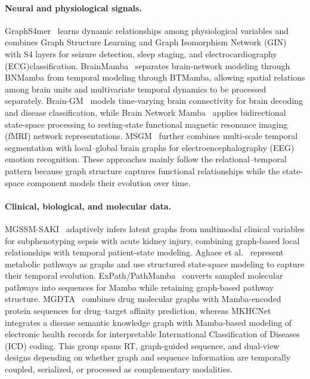 \documentclass[acmsmall]{acmart}
\begin{document}
\paragraph{\textbf{Neural and physiological signals.}}
GraphS4mer~\cite{tang2023modeling} learns dynamic relationships among
physiological variables and combines Graph Structure Learning and Graph Isomorphism Network (GIN) with S4
layers for seizure detection, sleep staging, and electrocardiography (ECG)classification.
BrainMamba~\cite{behrouz2024brain} separates brain-network modeling through
BNMamba from temporal modeling through BTMamba, allowing spatial relations
among brain units and multivariate temporal dynamics to be processed
separately. Brain-GM~\cite{wang2024learning} models time-varying brain
connectivity for brain decoding and disease classification, while Brain
Network Mamba~\cite{zhang2026brainnetworkmamba} applies bidirectional
state-space processing to resting-state functional magnetic resonance imaging (fMRI) network representations.
MSGM~\cite{liu2026msgm} further combines multi-scale temporal segmentation
with local--global brain graphs for electroencephalography (EEG) emotion recognition. These approaches
mainly follow the relational--temporal pattern because graph structure
captures functional relationships while the state-space component models their
evolution over time.

\paragraph{\textbf{Clinical, biological, and molecular data.}}
MGSSM-SAKI~\cite{xu2024identifying} adaptively infers latent graphs from
multimodal clinical variables for subphenotyping sepsis with acute kidney
injury, combining graph-based local relationships with temporal patient-state
modeling. Aghaee et al.~\cite{aghaee2024graph} represent metabolic pathways as
graphs and use structured state-space modeling to capture their temporal
evolution. ExPath/PathMamba~\cite{kotoge2026expath} converts sampled molecular
pathways into sequences for Mamba while retaining graph-based pathway
structure. MGDTA~\cite{han2024innovative} combines drug molecular graphs with
Mamba-encoded protein sequences for drug--target affinity prediction, whereas
MKHCNet~\cite{lu2025mamba} integrates a disease semantic knowledge graph with
Mamba-based modeling of electronic health records for interpretable International Classification of Diseases (ICD) coding.
This group spans RT, graph-guided sequence, and dual-view
designs depending on whether graph and sequence information are temporally
coupled, serialized, or processed as complementary modalities.
\end{document}
